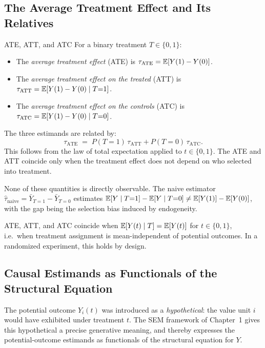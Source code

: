 \documentclass[master.tex]{subfiles}
\begin{document}
\subsection{The Average Treatment Effect and Its Relatives}

\begin{defn}{ATE, ATT, and ATC}
\label{w4:defn:ate}
For a binary treatment $T \in \{0,1\}$:
\begin{itemize}
  \item The \emph{average treatment effect} (ATE) is
        $\tau_{\mathrm{ATE}} = \mathbb{E}[Y(1) - Y(0)]$.
  \item The \emph{average treatment effect on the treated} (ATT) is
        $\tau_{\mathrm{ATT}} = \mathbb{E}[Y(1) - Y(0) \mid T{=}1]$.
  \item The \emph{average treatment effect on the controls} (ATC) is
        $\tau_{\mathrm{ATC}} = \mathbb{E}[Y(1) - Y(0) \mid T{=}0]$.
\end{itemize}
\end{defn}

The three estimands are related by:
\begin{equation}
  \tau_{\mathrm{ATE}}
  \;=\; P(T{=}1)\,\tau_{\mathrm{ATT}}
       + P(T{=}0)\,\tau_{\mathrm{ATC}}.
  \label{w4:eq:ate-decomp}
\end{equation}
This follows from the law of total expectation applied to $t \in \{0,1\}$.
The ATE and ATT coincide only when the treatment effect does not depend on
who selected into treatment.

None of these quantities is directly observable.  The naive estimator
$\hat\tau_{\mathrm{naive}} = \bar{Y}_{T=1} - \bar{Y}_{T=0}$ estimates
$\mathbb{E}[Y \mid T{=}1] - \mathbb{E}[Y \mid T{=}0] \neq \mathbb{E}[Y(1)] - \mathbb{E}[Y(0)]$,
with the gap being the selection bias induced by endogeneity.

\begin{remark}
ATE, ATT, and ATC coincide when $\mathbb{E}[Y(t) \mid T] = \mathbb{E}[Y(t)]$ for
$t \in \{0,1\}$, i.e.\ when treatment assignment is mean-independent of
potential outcomes.  In a randomized experiment, this holds by design.
\end{remark}

\subsection{Causal Estimands as Functionals of the Structural Equation}
\label{w4:subsec:sem-po}

The potential outcome $Y_i(t)$ was introduced as a \emph{hypothetical}:
the value unit $i$ would have exhibited under treatment $t$.  The SEM
framework of Chapter~1 gives this hypothetical a precise generative
meaning, and thereby expresses the potential-outcome estimands as
functionals of the structural equation for $Y$.
\end{document}
